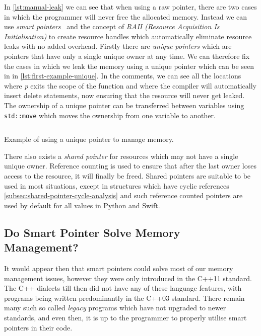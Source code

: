 \documentclass{proposal}
\begin{document}

    In \autoref{lst:manual-leak} we can see that when using a raw pointer, there are two cases in which the programmer will never free the allocated memory.
    Instead we can use \emph{smart pointers}~\cite{Dimov2003} and the concept of \emph{RAII (Resource Acquisition Is Initialisation)} to create resource handles which automatically eliminate resource leaks with no added overhead.
    Firstly there are \emph{unique pointers} which are pointers that have only a single unique owner at any time.
    We can therefore fix the cases in which we leak the memory using a unique pointer which can be seen in in \autoref{lst:first-example-unique}.
    In the comments, we can see all the locations where \emph{p} exits the scope of the function and where the compiler will automatically insert delete statements, now ensuring that the resource will never get leaked.
    The ownership of a unique pointer can be transferred between variables using \texttt{std::move} which moves the ownership from one variable to another.

    \begin{listing}
        \inputminted{c++}{code/first-example-unique.cpp}
        \caption{Example of using a unique pointer to manage memory.}
        \label{lst:first-example-unique}
    \end{listing}

    There also exists a \emph{shared pointer} for resources which may not have a single unique owner.
    Reference counting is used to ensure that after the last owner loses access to the resource, it will finally be freed.
    Shared pointers are suitable to be used in most situations, except in structures which have cyclic references \autoref{subsec:shared-pointer-cycle-analysis} and such reference counted pointers are used by default for all values in Python and Swift.


    \subsection{Do Smart Pointer Solve Memory Management?}\label{subsec:do-smart-pointer-solve-memory-management?}

    It would appear then that smart pointers could solve most of our memory management issues, however they were only introduced in the C++11 standard.
    The C++ dialects till then did not have any of these language features, with programs being written predominantly in the C++03 standard.
    There remain many such so called \emph{legacy} programs which have not upgraded to newer standards, and even then, it is up to the programmer to properly utilise smart pointers in their code.
\end{document}
